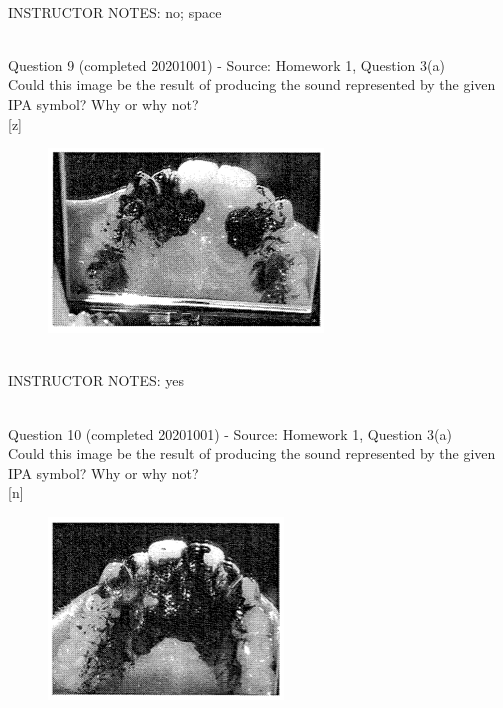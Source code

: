 \documentclass[12pt]{article}
\begin{document}
~\\
INSTRUCTOR NOTES: no; space


~\\

{\large Question 9} (completed 20201001) - Source: Homework 1, Question 3(a)\\

Could this image be the result of producing the sound represented by the given IPA symbol? Why or why not?\\

{[z]}

\begin{figure}[H]
\includegraphics{../images/staticpalatography_fricative.png}
\end{figure}

~\\
INSTRUCTOR NOTES: yes


~\\

{\large Question 10} (completed 20201001) - Source: Homework 1, Question 3(a)\\

Could this image be the result of producing the sound represented by the given IPA symbol? Why or why not?\\

{[n]}

\begin{figure}[H]
\includegraphics{../images/staticpalatography_stop.png}
\end{figure}
\end{document}
